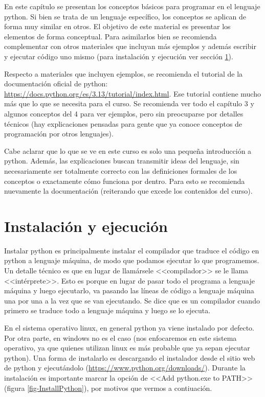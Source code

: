 \documentclass[a4paper, 12pt]{report}
\theoremstyle{definition}
\begin{document}
En este capítulo se presentan los conceptos básicos para programar en el lenguaje python. Si bien se trata de un lenguaje específico, los conceptos se aplican de forma muy similar en otros. El objetivo de este material es presentar los elementos de forma conceptual. Para asimilarlos bien se recomienda complementar con otros materiales que incluyan más ejemplos y además escribir y ejecutar código uno mismo (para instalación y ejecución ver sección \ref{sec-instalyEjec}).

Respecto a materiales que incluyen ejemplos, se recomienda el tutorial de la documentación oficial de python: \href{https://docs.python.org/es/3.13/tutorial/index.html}{https://docs.python.org/es/3.13/tutorial/index.html}. Ese tutorial contiene mucho más que lo que se necesita para el curso. Se recomienda ver todo el capítulo 3 y algunos conceptos del 4 para ver ejemplos, pero sin preocuparse por detalles técnicos (hay explicaciones pensadas para gente que ya conoce conceptos de programación por otros lenguajes).

Cabe aclarar que lo que se ve en este curso es solo una pequeña introducción a python. Además, las explicaciones buscan transmitir ideas del lenguaje, sin necesariamente ser totalmente correcto con las definiciones formales de los conceptos o exactamente cómo funciona por dentro. Para esto se recomienda nuevamente la documentación (reiterando que excede los contenidos del curso).

\section{Instalación y ejecución}\label{sec-instalyEjec}

Instalar python es principalmente instalar el compilador que traduce el código en python a lenguaje máquina, de modo que podamos ejecutar lo que programemos. Un detalle técnico es que en lugar de llamársele <<compilador>> se le llama <<intérprete>>. Esto es porque en lugar de pasar todo el programa a lenguaje máquina y luego ejecutarlo, va pasando las líneas de código a lenguaje máquina una por una a la vez que se van ejecutando. Se dice que es un compilador cuando primero se traduce todo a lenguaje máquina y luego se lo ejecuta.

En el sistema operativo linux, en general python ya viene instalado por defecto. Por otra parte, en windows no es el caso (nos enfocaremos en este sistema operativo, ya que quienes utilizan linux es más probable que ya sepan ejecutar python). Una forma de instalarlo es descargando el instalador desde el sitio web de python y ejecutándolo (\href{https://www.python.org/downloads/}{https://www.python.org/downloads/}). Durante la instalación es importante marcar la opción de <<Add python.exe to PATH>> (figura \ref{fig-InstallPython}), por motivos que vermos a contiuación.
\end{document}
